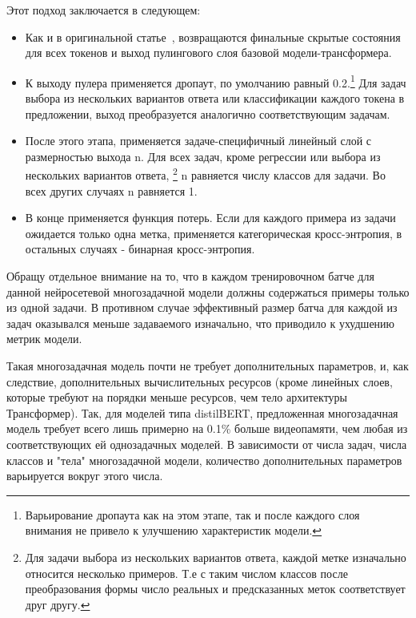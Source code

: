 Этот подход заключается в следующем:
\begin{itemize}

  \item Как и в оригинальной статье~\cite{bert}, возвращаются финальные скрытые состояния для всех токенов и выход пулингового слоя базовой модели-трансформера. 
  
  \item К выходу пулера применяется дропаут, по умолчанию равный 0.2.\footnote{Варьирование дропаута как на этом этапе, так и после каждого слоя внимания не привело к улучшению характеристик модели.} Для задач выбора из нескольких вариантов ответа или классификации каждого токена в предложении, выход преобразуется аналогично соответствующим задачам.

  \item После этого этапа, применяется задаче-специфичный линейный слой с размерностью выхода {n}. Для всех задач, кроме регрессии или выбора из нескольких вариантов ответа, \footnote{Для задачи выбора из нескольких вариантов ответа, каждой метке изначально относится несколько примеров. Т.е с таким числом классов после преобразования формы число реальных и предсказанных меток соответствует друг другу.} {n} равняется числу классов для задачи. Во всех других случаях {n} равняется 1.
 
  \item В конце применяется функция потерь. Если для каждого примера из задачи ожидается только одна метка, применяется категорическая кросс-энтропия, в остальных случаях - бинарная кросс-энтропия. 

\end{itemize}

Обращу отдельное внимание на то, что в каждом тренировочном батче для данной нейросетевой многозадачной модели должны содержаться примеры только из одной задачи. В противном случае эффективный размер батча для каждой из задач оказывался меньше задаваемого изначально, что приводило к ухудшению метрик модели. 

Такая многозадачная модель почти не требует дополнительных параметров, и, как следствие, дополнительных вычислительных ресурсов (кроме линейных слоев, которые требуют на порядки меньше ресурсов, чем тело архитектуры Трансформер). Так, для моделей типа distilBERT, предложенная многозадачная модель требует всего лишь примерно на  0.1\% больше видеопамяти, чем любая из соответствующих ей однозадачных моделей. В зависимости от числа задач, числа классов и "тела" многозадачной модели, количество дополнительных параметров варьируется вокруг этого числа. 

